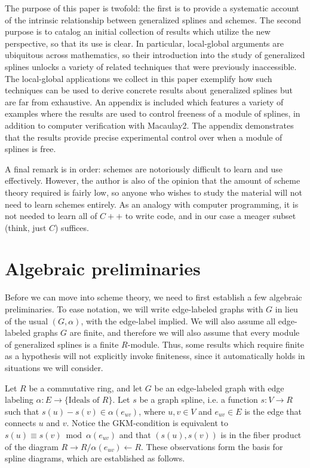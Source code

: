 \documentclass{article}
\begin{document}
The purpose of this paper is twofold: the first is to provide a systematic account of the intrinsic relationship between generalized splines and schemes. The second purpose is to catalog an initial collection of results which utilize the new perspective, so that its use is clear. In particular, local-global arguments are ubiquitous across mathematics, so their introduction into the study of generalized splines unlocks a variety of related techniques that were previously inaccessible. The local-global applications we collect in this paper exemplify how such techniques can be used to derive concrete results about generalized splines but are far from exhaustive. An appendix is included which features a variety of examples where the results are used to control freeness of a module of splines, in addition to computer verification with Macaulay2. The appendix demonstrates that the results provide precise experimental control over when a module of splines is free.

A final remark is in order: schemes are notoriously difficult to learn and use effectively. However, the author is also of the opinion that the amount of scheme theory required is fairly low, so anyone who wishes to study the material will not need to learn schemes entirely. As an analogy with computer programming, it is not needed to learn all of $C++$ to write code, and in our case a meager subset (think, just $C$) suffices.

\section{Algebraic preliminaries}
Before we can move into scheme theory, we need to first establish a few algebraic preliminaries. To ease notation, we will write edge-labeled graphs with $G$ in lieu of the usual $(G, \alpha)$, with the edge-label implied. We will also assume all edge-labeled graphs $G$ are finite, and therefore we will also assume that every module of generalized splines is a finite $R$-module. Thus, some results which require finite as a hypothesis will not explicitly invoke finiteness, since it automatically holds in situations we will consider.

Let $R$ be a commutative ring, and let $G$ be an edge-labeled graph with edge labeling $\alpha : E \rightarrow \{\text{Ideals of } R\}$. Let $s$ be a graph spline, i.e. a function $s : V \rightarrow R$ such that $s(u) - s(v) \in \alpha(e_{uv})$, where $u,v \in V$ and $e_{uv} \in E$ is the edge that connects $u$ and $v$. Notice the GKM-condition is equivalent to $s(u) \equiv s(v) \bmod{\alpha(e_{uv})}$ and that $(s(u), s(v))$ is in the fiber product of the diagram $R \rightarrow R/\alpha(e_{uv}) \leftarrow R$. These observations form the basis for spline diagrams, which are established as follows.
\end{document}

